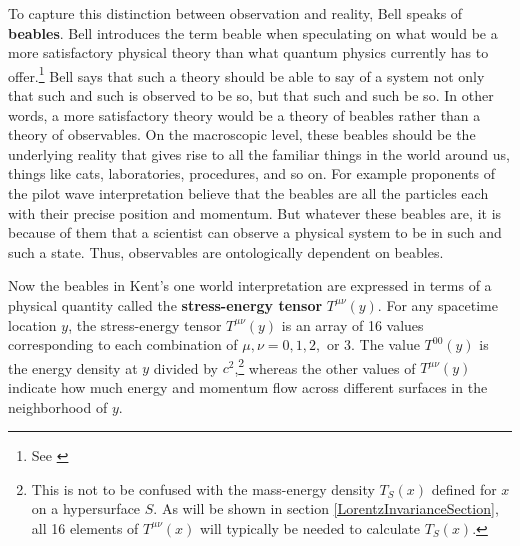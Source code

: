 To capture this distinction between observation and reality, Bell speaks of \textbf{beables}.\label{beabledef} Bell introduces the term beable when speculating on what would be a more satisfactory physical theory than what quantum physics currently has to offer.\footnote{See \cite{Bell2}} Bell says that such a theory should be able to say of a system not only that such and such is observed to be so, but that such and such be so. In other words, a more satisfactory theory would be a theory of beables rather than a theory of observables. On the macroscopic level, these beables should be the underlying reality that gives rise to all the familiar things in the world around us, things like cats, laboratories, procedures, and so on. For example proponents of the pilot wave interpretation believe that the beables are all the particles each with their precise position and momentum. But whatever these beables are, it is because of them that a scientist can observe a physical system to be in such and such a state. Thus, observables are ontologically dependent on beables.   

Now the beables in Kent's one world interpretation are expressed in terms of a physical quantity called the \textbf{stress-energy tensor}  $T^{\mu\nu}(y)$.\label{stressenergy}  For any spacetime location $y$, the stress-energy tensor $T^{\mu\nu}(y)$ is an array of 16 values corresponding to each combination of $\mu, \nu=0,1,2,$ or $3$. The value $T^{00}(y)$ is the energy density at $y$ divided by $c^2$,\footnote{This is not to be confused with the mass-energy density $T_S(x)$ defined for $x$ on a hypersurface $S$. As will be shown in section \ref{LorentzInvarianceSection},   all 16 elements of $T^{\mu\nu}(x)$ will typically be needed to calculate $T_S(x)$.} whereas the other values of $T^{\mu\nu}(y)$ indicate how much energy and momentum flow across different surfaces in the neighborhood of $y$. 

